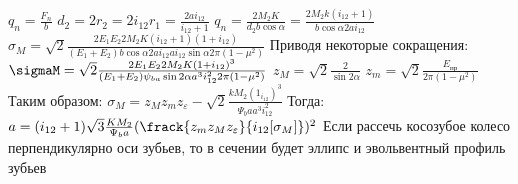 \documentclass{article}
\begin{document}
$q_n = \frac{F_n}{b}$
$d_2 = 2r_2 = 2i_{12}r_1 = \frac {2 a i_{12}}{i_{12} + 1}$
$q_n = \frac {2M_2 K}{d_2 b \cos{\alpha}} = \frac{2 M_2 k (i_{12} + 1)}{b \cos{\alpha} 2 a i_{12}}$
$\sigma_M = \sqrt{2}{\frac{2 E_1 E_2 2 M_2 K (i_{12} + 1) (1 + i_{12})}{(E_1 + E_2) b \cos{\alpha} 2 a i_{12} a i_{12} \sin{\alpha}2 \pi (1 - \mu^2)}}$
Приводя некоторые сокращения:
$\sigmaM = \sqrt{2}{\frac{2 E_1 E_2 2 M_2 K (1 + i_{12})^3}{(E_1 + E_2) \psi_{ba} \sin {2\alpha} a^3 i_{12}^2 2 \pi (1 - \mu^2)}}$
$z_M = \sqrt{2}{\frac{2}{\sin{2\alpha}}}$
$z_m = \sqrt{2}{\frac{E_{пр}}{2\pi(1-\mu^2)}}$
Таким образом:
$\sigma_M = z_M z_m z_\varepsilon - \sqrt{2}{\frac{k M_2 ( 1 _ i_{12})^3}{\Psi_ba a^3 i_{12}^2}}$
Тогда:
$a = (i_{12} + 1)\sqrt{3}{\frac{K M_2}{\Psi_ba}(\frack{z_m z_M z_\varepsilon}{i_{12}[\sigma_M]})^2}$
Если рассечь косозубое колесо перпендикулярно оси зубьев, то в сечении будет эллипс и эвольвентный профиль зубьев
\end{document}
